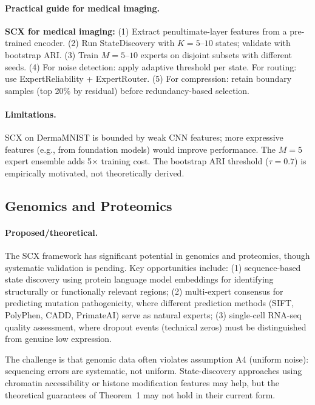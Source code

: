 \documentclass[twocolumn]{article}
\theoremstyle{definition}
\newenvironment{practicebox}
  {\begin{center}\begin{minipage}{0.92\columnwidth}\color{scxblue}\small\setlength{\parskip}{2pt}}
  {\end{minipage}\end{center}}
\begin{document}
\paragraph{Practical guide for medical imaging.}
\begin{practicebox}
\textbf{SCX for medical imaging:} (1) Extract penultimate-layer features from a pre-trained encoder. (2) Run StateDiscovery with $K = 5$--$10$ states; validate with bootstrap ARI. (3) Train $M = 5$--$10$ experts on disjoint subsets with different seeds. (4) For noise detection: apply adaptive threshold per state. For routing: use ExpertReliability + ExpertRouter. (5) For compression: retain boundary samples (top 20\% by residual) before redundancy-based selection.
\end{practicebox}

\paragraph{Limitations.}
SCX on DermaMNIST is bounded by weak CNN features; more expressive features (e.g., from foundation models) would improve performance. The $M=5$ expert ensemble adds 5$\times$ training cost. The bootstrap ARI threshold ($\tau=0.7$) is empirically motivated, not theoretically derived.

\subsection{Genomics and Proteomics}

\paragraph{Proposed/theoretical.}
The SCX framework has significant potential in genomics and proteomics, though systematic validation is pending. Key opportunities include: (1) sequence-based state discovery using protein language model embeddings for identifying structurally or functionally relevant regions; (2) multi-expert consensus for predicting mutation pathogenicity, where different prediction methods (SIFT, PolyPhen, CADD, PrimateAI) serve as natural experts; (3) single-cell RNA-seq quality assessment, where dropout events (technical zeros) must be distinguished from genuine low expression.

The challenge is that genomic data often violates assumption A4 (uniform noise): sequencing errors are systematic, not uniform. State-discovery approaches using chromatin accessibility or histone modification features may help, but the theoretical guarantees of Theorem~1 may not hold in their current form.
\end{document}
